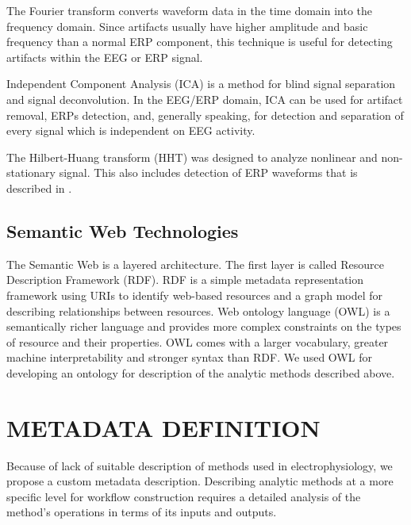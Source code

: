 \documentclass[a4paper,twoside]{article}
\begin{document}
The Fourier transform converts waveform data in the time domain into the frequency domain. Since artifacts usually have higher amplitude and basic frequency than a normal ERP component, this technique is useful for detecting artifacts within the EEG or ERP signal.

Independent Component Analysis (ICA) \cite{Hyv01} is a method for blind signal separation and signal deconvolution. In the EEG/ERP domain, ICA can be used for artifact removal, ERPs detection, and, generally speaking, for detection and separation of every signal which is independent on EEG activity.

The  Hilbert-Huang  transform  (HHT)  was  designed  to  analyze  nonlinear  and  non-stationary signal. This also includes detection of ERP waveforms that is described in \cite{Ciniburk11}.

\subsection{Semantic Web Technologies}

\noindent The Semantic Web is a layered architecture. The first layer is called Resource Description Framework (RDF). RDF is a simple metadata representation framework using URIs to identify web-based resources and a graph model for describing relationships between resources. Web ontology language (OWL) is a semantically richer language and provides more complex constraints on the types of resource and their properties. OWL comes with a larger vocabulary, greater machine interpretability and stronger syntax than RDF. We used OWL for developing an ontology for description of the analytic methods described above.

\section{\uppercase{Metadata Definition}}

\noindent Because of lack of suitable description of methods used in electrophysiology, we propose a custom metadata description. Describing analytic methods at a more specific level for workflow construction requires a detailed analysis of the method's operations in terms of its inputs and outputs.
\end{document}
